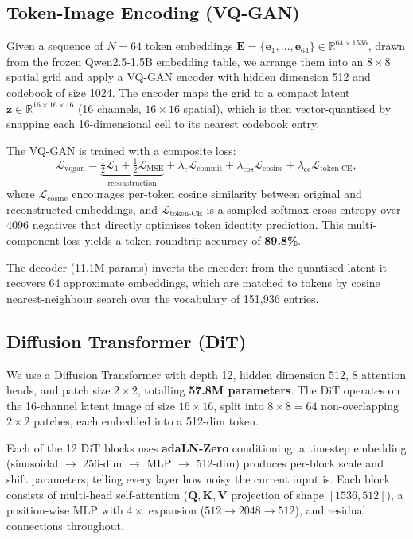 \documentclass[11pt,a4paper]{article}
\begin{document}
\subsection{Token-Image Encoding (VQ-GAN)}
\label{sec:vqgan}

Given a sequence of $N=64$ token embeddings
$\mathbf{E} = \{\mathbf{e}_1, \ldots, \mathbf{e}_{64}\} \in \mathbb{R}^{64 \times 1536}$,
drawn from the frozen Qwen2.5-1.5B \citep{qwen25} embedding table, we arrange them
into an $8\times 8$ spatial grid and apply a VQ-GAN encoder with hidden dimension 512
and codebook of size 1024.
The encoder maps the grid to a compact latent $\mathbf{z} \in \mathbb{R}^{16 \times 16 \times 16}$
(16 channels, $16\times 16$ spatial), which is then vector-quantised by snapping each
16-dimensional cell to its nearest codebook entry.

The VQ-GAN is trained with a composite loss:
\begin{equation}
  \mathcal{L}_{\text{vqgan}}
  = \underbrace{\tfrac{1}{2}\mathcal{L}_1 + \tfrac{1}{2}\mathcal{L}_{\text{MSE}}}_{\text{reconstruction}}
  + \lambda_c \mathcal{L}_{\text{commit}}
  + \lambda_{\cos} \mathcal{L}_{\text{cosine}}
  + \lambda_{\text{ce}} \mathcal{L}_{\text{token-CE}},
\end{equation}
where $\mathcal{L}_{\text{cosine}}$ encourages per-token cosine similarity between
original and reconstructed embeddings, and $\mathcal{L}_{\text{token-CE}}$ is a sampled
softmax cross-entropy over 4096 negatives that directly optimises token identity
prediction. This multi-component loss yields a token roundtrip accuracy of \textbf{89.8\%}.

The decoder (11.1M params) inverts the encoder: from the quantised latent it recovers
64 approximate embeddings, which are matched to tokens by cosine nearest-neighbour
search over the vocabulary of 151{,}936 entries.

\subsection{Diffusion Transformer (DiT)}
\label{sec:dit}

We use a Diffusion Transformer \citep{peebles2023dit} with depth 12, hidden dimension
512, 8 attention heads, and patch size $2\times2$, totalling \textbf{57.8M parameters}.
The DiT operates on the 16-channel latent image of size $16\times16$, split into
$8\times8=64$ non-overlapping $2\times2$ patches, each embedded into a 512-dim token.

Each of the 12 DiT blocks uses \textbf{adaLN-Zero} conditioning: a timestep embedding
(sinusoidal $\to$ 256-dim $\to$ MLP $\to$ 512-dim) produces per-block scale and shift
parameters, telling every layer how noisy the current input is.
Each block consists of multi-head self-attention ($\mathbf{Q},\mathbf{K},\mathbf{V}$
projection of shape $[1536,512]$), a position-wise MLP with $4\times$ expansion
($512\to2048\to512$), and residual connections throughout.
\end{document}
